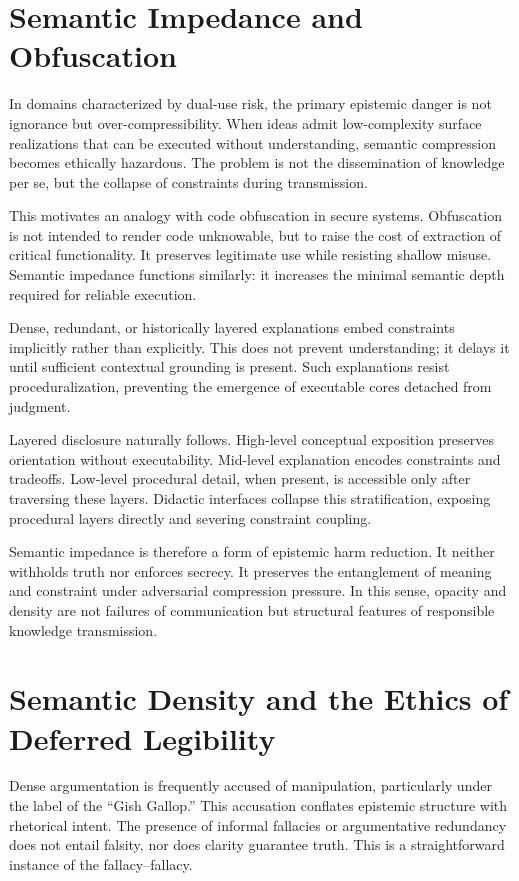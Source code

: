 \section{Semantic Impedance and Obfuscation}

In domains characterized by dual-use risk, the primary epistemic danger is not ignorance but over-compressibility. When ideas admit low-complexity surface realizations that can be executed without understanding, semantic compression becomes ethically hazardous. The problem is not the dissemination of knowledge per se, but the collapse of constraints during transmission.

This motivates an analogy with code obfuscation in secure systems. Obfuscation is not intended to render code unknowable, but to raise the cost of extraction of critical functionality. It preserves legitimate use while resisting shallow misuse. Semantic impedance functions similarly: it increases the minimal semantic depth required for reliable execution.

Dense, redundant, or historically layered explanations embed constraints implicitly rather than explicitly. This does not prevent understanding; it delays it until sufficient contextual grounding is present. Such explanations resist proceduralization, preventing the emergence of executable cores detached from judgment.

Layered disclosure naturally follows. High-level conceptual exposition preserves orientation without executability. Mid-level explanation encodes constraints and tradeoffs. Low-level procedural detail, when present, is accessible only after traversing these layers. Didactic interfaces collapse this stratification, exposing procedural layers directly and severing constraint coupling.

Semantic impedance is therefore a form of epistemic harm reduction. It neither withholds truth nor enforces secrecy. It preserves the entanglement of meaning and constraint under adversarial compression pressure. In this sense, opacity and density are not failures of communication but structural features of responsible knowledge transmission.

\section{Semantic Density and the Ethics of Deferred Legibility}

Dense argumentation is frequently accused of manipulation, particularly under the label of the ``Gish Gallop.'' This accusation conflates epistemic structure with rhetorical intent. The presence of informal fallacies or argumentative redundancy does not entail falsity, nor does clarity guarantee truth. This is a straightforward instance of the fallacy–fallacy.

